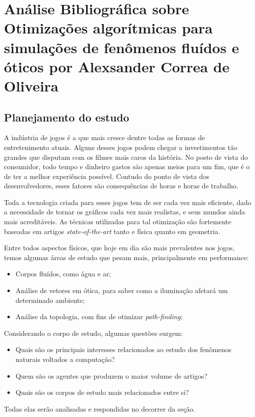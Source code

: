 \chapter{Análise Bibliográfica sobre Otimizações algorítmicas para simulações de fenômenos fluídos e óticos por Alexsander Correa de Oliveira}

\section{Planejamento do estudo}
    A indústria de jogos é a que mais cresce dentre todas as formas de entretenimento atuais. Alguns desses jogos podem chegar a investimentos tão grandes que disputam com os filmes mais caros da história. No posto de vista do consumidor, todo tempo e dinheiro gastos são apenas meios para um fim, que é o de ter a melhor experiência possível. Contudo do ponto de vista dos desenvolvedores, esses fatores são consequências de horas e horas de trabalho.
    
    Toda a tecnologia criada para esses jogos tem de ser cada vez mais eficiente, dado a necessidade de tornar os gráficos cada vez mais realistas, e seus mundos ainda mais acreditáveis. As técnicas utilizadas para tal otimização são fortemente baseadas em artigos \emph{state-of-the-art} tanto e física quanto em geometria.
    
    Entre todos aspectos físicos, que hoje em dia são mais prevalentes nos jogos, temos algumas áreas de estudo que pesam mais, principalmente em performance: 
    \begin{itemize}
        \item Corpos fluídos, como água e ar;
        \item Análise de vetores em ótica, para saber como a iluminação afetará um determinado ambiente;
        \item Análise da topologia, com fins de otimizar \emph{path-finding};
    \end{itemize}
    
    Considerando o corpo de estudo, algumas questões surgem:
    \begin{itemize}
        \item Quais são os principais interesses relacionados ao estudo dos fenômenos naturais voltados a computação?
        \item Quem são os agentes que produzem o maior volume de artigos?
        \item Quais são os corpos de estudo mais relacionados entre si?
    \end{itemize}
    Todas elas serão analisadas e respondidas no decorrer da seção.
    
